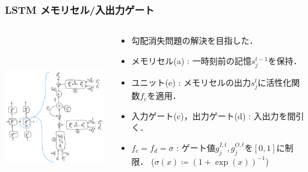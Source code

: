 \documentclass[dvipdfmx]{beamer}
\newcommand{\g}[2]{g_{#1}^{#2}}
\newcommand{\s}[2]{s_{#1}^{#2}}
\begin{document}
\begin{frame}
    \frametitle{LSTM \small{メモリセル/入出力ゲート}}
    \begin{columns}
        \begin{column}[T]{0.60\textwidth}
            \centering
            \includegraphics[width=7.2cm, height=7.2cm]{figure/lstm_original.png}
        \end{column}
        \begin{column}[T]{0.40\textwidth}
            \begin{itemize}
                \item 勾配消失問題の解決を目指した．
                \item メモリセル(a) : 一時刻前の記憶$\s{j}{t-1}$を保持．
                \item ユニット(e) : メモリセルの出力$\s{j}{t}$に活性化関数$f_e$を適用．
                \item 入力ゲート(c)，出力ゲート(d) : 入出力を間引く．
                \item $f_c = f_d = \sigma$ : ゲート値$\g{j}{I,t}, \g{j}{O,t}$を$[0, 1]$に制限．
                {\footnotesize ($\sigma (x) \coloneqq (1 + \exp(x))^{-1}$)}
            \end{itemize}
        \end{column}
    \end{columns}
\end{frame}
\end{document}
